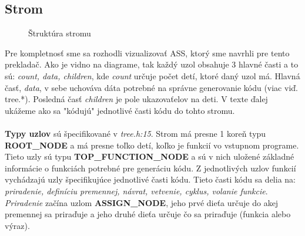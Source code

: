 \documentclass[Slovak, a4paper, 12pt]{article}
\begin{document}
	\subsection{Strom}
	\begin{figure}
		\caption{Štruktúra stromu}
	\end{figure}
	Pre kompletnosť sme sa rozhodli vizualizovať ASS, ktorý sme navrhli pre tento prekladač.
	Ako je vidno na diagrame, tak každý uzol obsahuje 3 hlavné časti a to sú: \textit{count, data, children}, kde \textit{count}
	určuje počet detí, ktoré daný uzol má. Hlavná časť, \textit{data}, v sebe uchováva dáta potrebné na správne generovanie kódu
	(viac viď. tree.*). Posledná časť \textit{children} je pole ukazovaťelov na deti.  V texte ďalej ukážeme ako sa "kódujú" jednotlivé časti kódu do tohto stromu.
	\\\\
	\textbf{Typy uzlov} sú špecifikované v \textit{tree.h:15}. Strom má presne 1 koreň typu \textbf{ROOT\_NODE}  a má presne toľko detí, koľko je funkcií vo
	vstupnom programe. Tieto uzly sú typu \textbf{TOP\_FUNCTION\_NODE} a sú v nich uložené základné informácie o funkciách potrebné pre generáciu kódu.
	Z jednotlivých uzlov funkcií vychádzajú uzly špecifikujúce jednotlivé časti kódu. Tieto časti kódu sa delia na: \textit{priradenie, definíciu premennej, návrat, vetvenie, cyklus, volanie funkcie}. \\[0.6em]
	\textit{Priradenie} začína uzlom \textbf{ASSIGN\_NODE}, jeho prvé dieťa určuje do akej premennej sa priraďuje a jeho druhé dieťa určuje čo sa priraďuje (funkcia alebo výraz).\\[0.6em]
\end{document}
